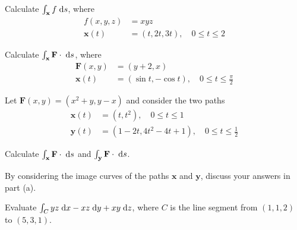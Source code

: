 \documentclass[boxes]{gsypset}
\begin{document}
	\begin{problem}[6.1.2]
		Calculate $\int_\mathbf{x} f \;\mathrm{d}s$, where
		\begin{align*}
			f(x,y,z) &= xyz \\
			\mathbf{x}(t) &= (t, 2t, 3t),\quad 0 \leq t \leq 2
		\end{align*}
	\end{problem}
	\begin{solution}
		
	\end{solution}
	
	\begin{problem}[6.1.9]
		Calculate $\int_\mathbf{x} \mathbf{F} \cdot \;\mathrm{d}s$, where
		\begin{align*}
			\mathbf{F}(x,y) &= (y+2, x) \\
			\mathbf{x}(t) &= (\sin t, -\cos t),\quad 0 \leq t \leq \frac{\pi}{2}
		\end{align*}
	\end{problem}
	\begin{solution}
		
	\end{solution}
	
	\begin{problem}[6.1.21]
		Let $\mathbf{F}(x,y) = (x^2 + y, y - x)$ and consider the two paths
		\begin{align*}
			\mathbf{x}(t) &= (t, t^2),\quad 0 \leq t \leq 1 \\
			\mathbf{y}(t) &= (1 - 2t, 4t^2 - 4t + 1),\quad 0 \leq t \leq \frac{1}{2}
		\end{align*}
		\begin{subproblems}
			\subproblem
				Calculate $\int_\mathbf{x} \mathbf{F} \cdot \;\mathrm{d}s$ and 
				$\int_\mathbf{y} \mathbf{F} \cdot \;\mathrm{d}s$.
				\begin{solution}
					
				\end{solution}
			\subproblem
				By considering the image curves of the paths $\mathbf{x}$ and $\mathbf{y}$,
				discuss your answers in part (a).
				\begin{solution}
					
				\end{solution}
		\end{subproblems}
	\end{problem}
	
	\begin{problem}[6.1.31]
		Evaluate $\int_C yz \;\mathrm{d}x - xz \;\mathrm{d}y + xy \;\mathrm{d}z$, where $C$ is the line segment
		from $(1, 1, 2)$ to $(5, 3, 1)$.
	\end{problem}
	\begin{solution}
		
	\end{solution}
	
\end{document}
